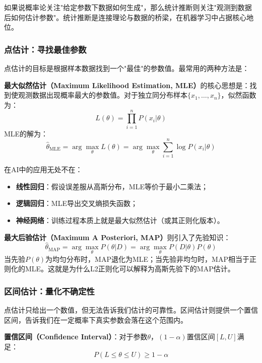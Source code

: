 如果说概率论关注"给定参数下数据如何生成"，那么统计推断则关注"观测到数据后如何估计参数"。统计推断是连接理论与数据的桥梁，在机器学习中占据核心地位。

\subsubsection{点估计：寻找最佳参数}

点估计的目标是根据样本数据找到一个"最佳"的参数值。最常用的两种方法是：

\textbf{最大似然估计（Maximum Likelihood Estimation, MLE）}的核心思想是：找到使观测数据出现概率最大的参数值。对于独立同分布样本$\{x_1, \ldots, x_n\}$，似然函数为：
\begin{equation}
L(\theta) = \prod_{i=1}^n P(x_i|\theta)
\end{equation}
MLE的解为：
\begin{equation}
\hat{\theta}_{\text{MLE}} = \arg\max_\theta L(\theta) = \arg\max_\theta \sum_{i=1}^n \log P(x_i|\theta)
\end{equation}

在AI中的应用无处不在：
\begin{itemize}
  \item \textbf{线性回归}：假设误差服从高斯分布，MLE等价于最小二乘法；
  \item \textbf{逻辑回归}：MLE导出交叉熵损失函数；
  \item \textbf{神经网络}：训练过程本质上就是最大似然估计（或其正则化版本）。
\end{itemize}

\textbf{最大后验估计（Maximum A Posteriori, MAP）}则引入了先验知识：
\begin{equation}
\hat{\theta}_{\text{MAP}} = \arg\max_\theta P(\theta|D) = \arg\max_\theta P(D|\theta)P(\theta)
\end{equation}
当先验$P(\theta)$为均匀分布时，MAP退化为MLE；当先验非均匀时，MAP相当于正则化的MLE。这就是为什么L2正则化可以解释为高斯先验下的MAP估计。

\subsubsection{区间估计：量化不确定性}

点估计只给出一个数值，但无法告诉我们估计的可靠性。区间估计则提供一个置信区间，告诉我们在一定概率下真实参数会落在这个范围内。

\textbf{置信区间（Confidence Interval）}：对于参数$\theta$，$(1-\alpha)$置信区间$[L, U]$满足：
\begin{equation}
P(L \leq \theta \leq U) \geq 1-\alpha
\end{equation}

